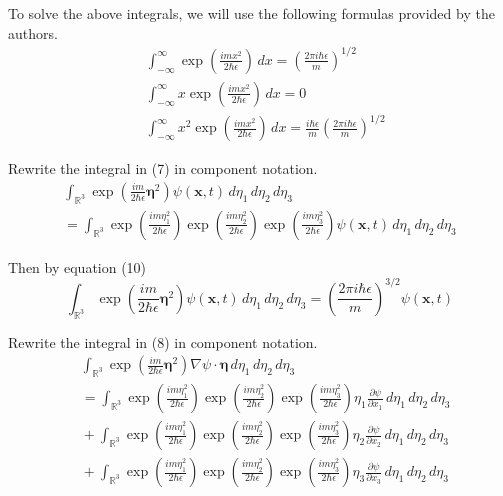 \documentclass[12pt]{article}
\begin{document}
To solve the above integrals, we will use the following formulas provided by the authors.
\begin{align*}
&\int_{-\infty}^\infty\exp\left(\frac{imx^2}{2\hbar\epsilon}\right)\,dx
=\left(\frac{2\pi i\hbar\epsilon}{m}\right)^{1/2}
\tag{10}
\\
&\int_{-\infty}^\infty x \exp\left(\frac{imx^2}{2\hbar\epsilon}\right)\,dx=0
\tag{11}
\\
&\int_{-\infty}^\infty x^2 \exp\left(\frac{imx^2}{2\hbar\epsilon}\right)\,dx
=\frac{i\hbar\epsilon}{m}\left(\frac{2\pi i\hbar\epsilon}{m}\right)^{1/2}
\tag{12}
\end{align*}

Rewrite the integral in (7) in component notation.
\begin{multline*}
\int_{\mathbb R^3}
\exp\left(\frac{im}{2\hbar\epsilon}\boldsymbol\eta^2\right)
\psi(\mathbf x,t)
\,d\eta_1\,d\eta_2\,d\eta_3
\\
{}=\int_{\mathbb R^3}
\exp\left(\frac{im\eta_1^2}{2\hbar\epsilon}\right)
\exp\left(\frac{im\eta_2^2}{2\hbar\epsilon}\right)
\exp\left(\frac{im\eta_3^2}{2\hbar\epsilon}\right)
\psi(\mathbf x,t)
\,d\eta_1\,d\eta_2\,d\eta_3
\end{multline*}

Then by equation (10)
\begin{equation*}
\int_{\mathbb R^3}
\exp\left(\frac{im}{2\hbar\epsilon}\boldsymbol\eta^2\right)
\psi(\mathbf x,t)
\,d\eta_1\,d\eta_2\,d\eta_3
=\left(\frac{2\pi i\hbar\epsilon}{m}\right)^{3/2}
\psi(\mathbf x,t)
\tag{13}
\end{equation*}

Rewrite the integral in (8) in component notation.
\begin{align*}
&\int_{\mathbb R^3}
\exp\left(\frac{im}{2\hbar\epsilon}\boldsymbol\eta^2\right)
\nabla\psi\cdot\boldsymbol\eta
\,d\eta_1\,d\eta_2\,d\eta_3
\\
&{}=\int_{\mathbb R^3}
\exp\left(\frac{im\eta_1^2}{2\hbar\epsilon}\right)
\exp\left(\frac{im\eta_2^2}{2\hbar\epsilon}\right)
\exp\left(\frac{im\eta_3^2}{2\hbar\epsilon}\right)
\eta_1\frac{\partial\psi}{\partial x_1}
\,d\eta_1\,d\eta_2\,d\eta_3
\\
&{}+\int_{\mathbb R^3}
\exp\left(\frac{im\eta_1^2}{2\hbar\epsilon}\right)
\exp\left(\frac{im\eta_2^2}{2\hbar\epsilon}\right)
\exp\left(\frac{im\eta_3^2}{2\hbar\epsilon}\right)
\eta_2\frac{\partial\psi}{\partial x_2}
\,d\eta_1\,d\eta_2\,d\eta_3
\\
&{}+\int_{\mathbb R^3}
\exp\left(\frac{im\eta_1^2}{2\hbar\epsilon}\right)
\exp\left(\frac{im\eta_2^2}{2\hbar\epsilon}\right)
\exp\left(\frac{im\eta_3^2}{2\hbar\epsilon}\right)
\eta_3\frac{\partial\psi}{\partial x_3}
\,d\eta_1\,d\eta_2\,d\eta_3
\end{align*}
\end{document}
